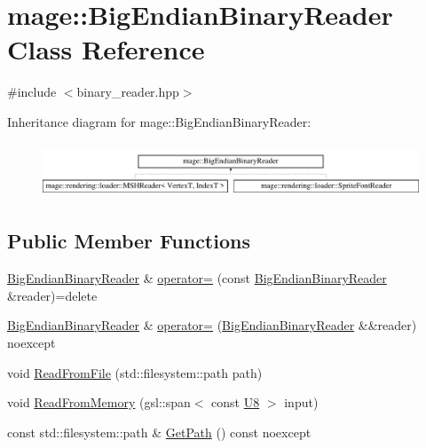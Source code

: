 \hypertarget{classmage_1_1_big_endian_binary_reader}{}\section{mage\+:\+:Big\+Endian\+Binary\+Reader Class Reference}
\label{classmage_1_1_big_endian_binary_reader}


{\ttfamily \#include $<$binary\+\_\+reader.\+hpp$>$}

Inheritance diagram for mage\+:\+:Big\+Endian\+Binary\+Reader\+:\begin{figure}[H]
\begin{center}
\leavevmode
\includegraphics[height=1.637427cm]{classmage_1_1_big_endian_binary_reader}
\end{center}
\end{figure}
\subsection*{Public Member Functions}
\begin{DoxyCompactItemize}
\item 
\mbox{\hyperlink{classmage_1_1_big_endian_binary_reader}{Big\+Endian\+Binary\+Reader}} \& \mbox{\hyperlink{classmage_1_1_big_endian_binary_reader_abd4b24df4219469a8c2e9253b1cad405}{operator=}} (const \mbox{\hyperlink{classmage_1_1_big_endian_binary_reader}{Big\+Endian\+Binary\+Reader}} \&reader)=delete
\item 
\mbox{\hyperlink{classmage_1_1_big_endian_binary_reader}{Big\+Endian\+Binary\+Reader}} \& \mbox{\hyperlink{classmage_1_1_big_endian_binary_reader_ac37539cb08ea9278daf5628a0c5895d8}{operator=}} (\mbox{\hyperlink{classmage_1_1_big_endian_binary_reader}{Big\+Endian\+Binary\+Reader}} \&\&reader) noexcept
\item 
void \mbox{\hyperlink{classmage_1_1_big_endian_binary_reader_a0308b90e3cf888d383a228cfe8827972}{Read\+From\+File}} (std\+::filesystem\+::path path)
\item 
void \mbox{\hyperlink{classmage_1_1_big_endian_binary_reader_afc48490dca5042078726a1ec3fe7abe7}{Read\+From\+Memory}} (gsl\+::span$<$ const \mbox{\hyperlink{namespacemage_afc638980bc6154f15af5e2d93a0e0ea9}{U8}} $>$ input)
\item 
const std\+::filesystem\+::path \& \mbox{\hyperlink{classmage_1_1_big_endian_binary_reader_a1d21e0117af4cbf99152e4a659372364}{Get\+Path}} () const noexcept
\end{DoxyCompactItemize}

